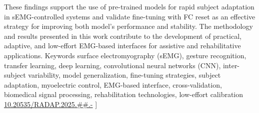 \begin{multicols}{2}
{These findings support the use of pre-trained models for rapid subject adaptation in sEMG-controlled systems and validate fine-tuning with FC reset as an effective strategy for improving both model's performance and stability. The methodology and results presented in this work contribute to the development of practical, adaptive, and low-effort EMG-based interfaces for assistive and rehabilitative applications.
}
{Keywords}{
surface electromyography (sEMG), gesture recognition, transfer learning, deep learning, convolutional neural networks (CNN), inter-subject variability, model generalization, fine-tuning strategies, subject adaptation, myoelectric control, EMG-based interface, cross-validation, biomedical signal processing, rehabilitation technologies, low-effort calibration
 }
{\href{http://radap.kpi.ua/radiotechnique/article/view/20NN}{10.20535/RADAP.2025.\#\#.\pageref{radap20NN:FirstPage}-\pageref{radap20NN:LastPage}}}
]

  


\end{multicols}
